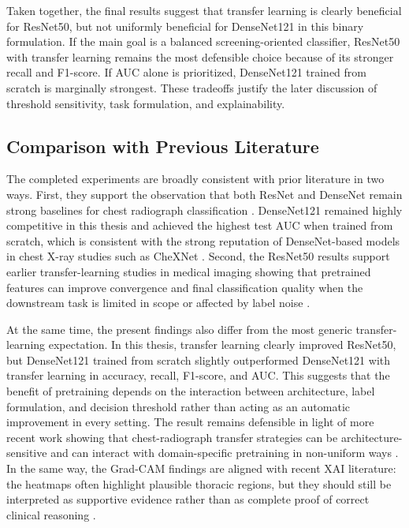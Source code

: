 Taken together, the final results suggest that transfer learning is clearly beneficial for ResNet50, but not uniformly beneficial for DenseNet121 in this binary formulation. If the main goal is a balanced screening-oriented classifier, ResNet50 with transfer learning remains the most defensible choice because of its stronger recall and F1-score. If AUC alone is prioritized, DenseNet121 trained from scratch is marginally strongest. These tradeoffs justify the later discussion of threshold sensitivity, task formulation, and explainability.

\subsection{Comparison with Previous Literature}
The completed experiments are broadly consistent with prior literature in two ways. First, they support the observation that both ResNet and DenseNet remain strong baselines for chest radiograph classification \cite{ref:wang2017,ref:baltruschat2019}. DenseNet121 remained highly competitive in this thesis and achieved the highest test AUC when trained from scratch, which is consistent with the strong reputation of DenseNet-based models in chest X-ray studies such as CheXNet \cite{ref:rajpurkar2017}. Second, the ResNet50 results support earlier transfer-learning studies in medical imaging showing that pretrained features can improve convergence and final classification quality when the downstream task is limited in scope or affected by label noise \cite{ref:tajbakhsh2016,ref:shin2016}.

At the same time, the present findings also differ from the most generic transfer-learning expectation. In this thesis, transfer learning clearly improved ResNet50, but DenseNet121 trained from scratch slightly outperformed DenseNet121 with transfer learning in accuracy, recall, F1-score, and AUC. This suggests that the benefit of pretraining depends on the interaction between architecture, label formulation, and decision threshold rather than acting as an automatic improvement in every setting. The result remains defensible in light of more recent work showing that chest-radiograph transfer strategies can be architecture-sensitive and can interact with domain-specific pretraining in non-uniform ways \cite{ref:imagawa2024,ref:chu2025ssl,ref:yuan2025,ref:yang2025foundation}. In the same way, the Grad-CAM findings are aligned with recent XAI literature: the heatmaps often highlight plausible thoracic regions, but they should still be interpreted as supportive evidence rather than as complete proof of correct clinical reasoning \cite{ref:selvaraju2017,ref:aasem2024,ref:ihongbe2024,ref:bhati2024,ref:ahmed2026xai}.

